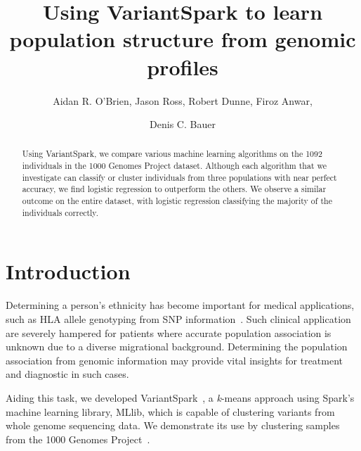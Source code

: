 \documentclass{llncs}
\newcommand{\variantSpark}{{\sc VariantSpark}}
\newcommand{\kMeans}{\textit{k}-means }
\begin{document}
\setcounter{save}{\value{section}}
{\def\addtocontents#1#2{}%
\def\addcontentsline#1#2#3{}%
\def\markboth#1#2{}%
%
\title{Using VariantSpark to learn population structure from genomic profiles}

\author{Aidan R. O'Brien, Jason Ross, Robert Dunne, Firoz Anwar, \and Denis C. Bauer}


\maketitle
%
\begin{abstract}
Using VariantSpark, we compare various machine learning algorithms on the 1092 individuals in the 1000 Genomes Project dataset.
Although each algorithm that we investigate can classify or cluster individuals from three populations with near perfect accuracy,
we find logistic regression to outperform the others. We observe a similar outcome on the entire dataset, with logistic regression
classifying the majority of the individuals correctly. 

\end{abstract}
%
\section{Introduction}
%


Determining a person's ethnicity has become important for medical applications, such as HLA allele genotyping from SNP
information~\cite{Zheng2014}. Such clinical application are severely hampered for patients where accurate population
association is unknown due to a diverse migrational background. Determining the population association from genomic
information may provide vital insights for treatment and diagnostic in such cases.

Aiding this task, we developed \variantSpark~\cite{OBrien}, a \kMeans{} approach using {\sc Spark}'s machine learning
library, {\sc MLlib}, which is capable of clustering variants from whole genome sequencing data.  We demonstrate its use
by clustering samples from the 1000 Genomes Project~\cite{1KG2012}. 

}
\end{document}
